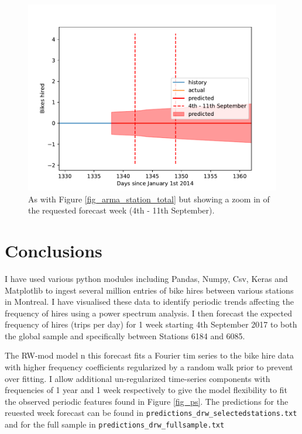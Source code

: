 \documentclass[10pt]{article}
\begin{document}
\begin{figure}
\includegraphics[scale=1.0,angle=0,trim=0cm 0cm 0cm 0cm]{arma_specstat_zoom.pdf}
\caption{As with Figure \ref{fig_arma_station_total} but showing a zoom in of the requested forecast week (4th - 11th September).}
\label{fig_arma_station_zoom}
\end{figure}






\section{Conclusions}
I have used various python modules including Pandas, Numpy, Csv, Keras and Matplotlib to ingest several million entries of bike hires between various stations in Montreal. I have visualised these data to identify periodic trends affecting the frequency of hires using a power spectrum analysis. I then forecast the expected frequency of hires (trips per day) for 1 week starting 4th September 2017 to both the global sample and specifically between Stations 6184 and 6085.

The RW-mod model n this forecast fits a Fourier tim series to the bike hire data with higher frequency coefficients regularized by a random walk prior to prevent over fitting. I allow additional un-regularized time-series components with frequencies of 1 year and 1 week respectively to give the model flexibility to fit the observed periodic features found in Figure \ref{fig_ps}. The predictions for the reuested week forecast can be found in \verb|predictions_drw_selectedstations.txt| and for the full sample in \verb|predictions_drw_fullsample.txt|
\end{document}

